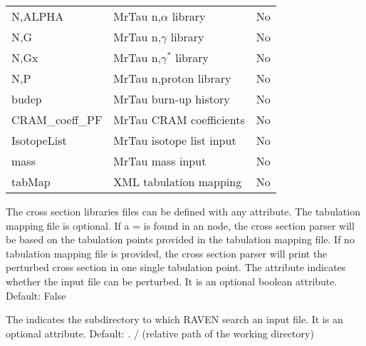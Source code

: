 \begin{table}[]
\begin{tabular}{l|l|l}
N,ALPHA                 & MrTau n,$\alpha$ library                     & No                   \\
N,G                     & MrTau n,$\gamma$ library                     & No                   \\
N,Gx                    & MrTau n,$\gamma^*$ library                   & No                   \\
N,P                     & MrTau n,proton library                       & No                   \\
budep                   & MrTau burn-up history                        & No                   \\
CRAM\_coeff\_PF         & MrTau CRAM coefficients                      & No                   \\
IsotopeList             & MrTau isotope list input                     & No                   \\
mass                    & MrTau mass input                             & No                   \\
tabMap             & XML tabulation mapping                       & No
    \end{tabular}
\end{table}

The cross section libraries files can be defined with any  attribute.
The tabulation mapping file is optional. If a = is found in an  node, the cross section
parser will be based on the tabulation points provided in the tabulation mapping file. If no tabulation mapping file is provided,
the cross section parser will print the perturbed cross section in one single tabulation point.
The  attribute indicates whether the input file can be perturbed. It is an optional boolean attribute.
Default: False

The  indicates the subdirectory to which RAVEN search an input file. It is an optional attribute.
Default: . / (relative path of the working directory)

